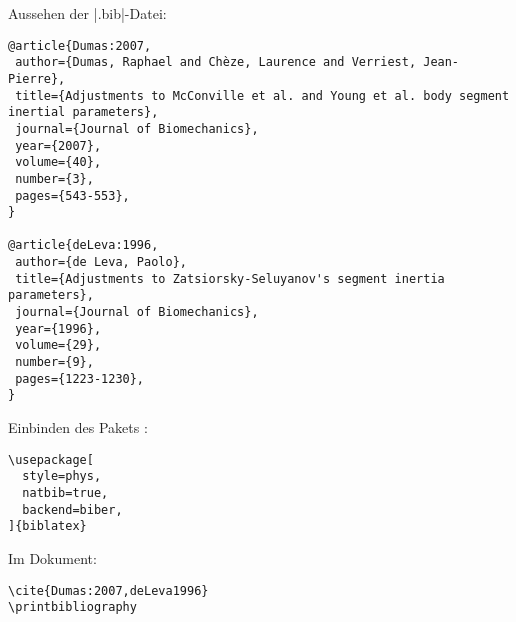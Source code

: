 % 

Aussehen der |.bib|-Datei:
\begin{lstlisting}
@article{Dumas:2007,
 author={Dumas, Raphael and Chèze, Laurence and Verriest, Jean-Pierre},
 title={Adjustments to McConville et al. and Young et al. body segment inertial parameters},
 journal={Journal of Biomechanics},
 year={2007},
 volume={40},
 number={3},
 pages={543-553},
}

@article{deLeva:1996,
 author={de Leva, Paolo},
 title={Adjustments to Zatsiorsky-Seluyanov's segment inertia parameters},
 journal={Journal of Biomechanics},
 year={1996},
 volume={29},
 number={9},
 pages={1223-1230},
}
\end{lstlisting}


Einbinden des Pakets :
\begin{lstlisting}
\usepackage[
  style=phys,
  natbib=true,
  backend=biber,
]{biblatex}
\end{lstlisting}
Im Dokument:
\begin{lstlisting}
\cite{Dumas:2007,deLeva1996}
\printbibliography
\end{lstlisting}